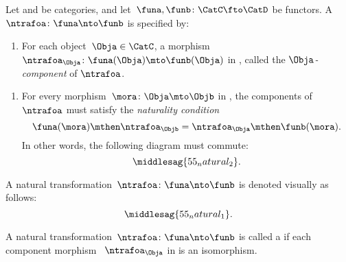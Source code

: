 \begin{ctdefinition}
    \label{def:natural-transformation}
    Let \CatC and \CatD be categories, and let~$\funa,\funb\colon \CatC\fto \CatD$ be functors.
    A \emph{}~$\ntrafoa \colon \funa\nto \funb$ is specified by:

    \constit
    \begin{enumerate}
        \item For each object~$\Obja\in \CatC$, a morphism $\ntrafoa_\Obja \colon \funa(\Obja)\mto \funb(\Obja)$ in \CatD, called the $\Obja$\emph{-component} of $\ntrafoa$.
    \end{enumerate}
    \condit
    \begin{enumerate}
        \item For every morphism~$\mora\colon \Obja\mto \Objb$ in \CatC, the components of $\ntrafoa$ must satisfy the \emph{naturality condition}
              \begin{equation}
                  \funa(\mora)\mthen \ntrafoa_\Objb = \ntrafoa_\Obja\mthen \funb(\mora).
              \end{equation}
              In other words, the following diagram must commute:
              \begin{equation}
                  \middlesag{55_natural_2}.
              \end{equation}
    \end{enumerate}

\end{ctdefinition}
A natural transformation~$\ntrafoa \colon \funa\nto \funb$ is denoted visually as follows:
\begin{equation}
    \middlesag{55_natural_1}.
\end{equation}
\begin{figure}[h!]
    \centering
    \begin{ctdefinitionshade}
    \end{ctdefinitionshade}
    \caption{}
    \label{fig:nat_trans_graphically}
\end{figure}

\begin{ctdefinition}
    \label{def:nat_iso}
    A natural transformation~$\ntrafoa \colon \funa \nto \funb $ is called a \emph{} if each component morphism ~$\ntrafoa_\Obja$ in \CatD is an isomorphism.
\end{ctdefinition}
\clearpage
